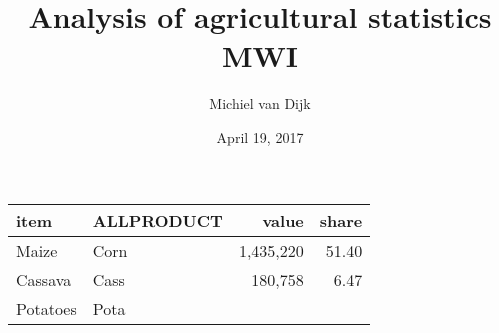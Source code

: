\documentclass[]{article}
\title{Analysis of agricultural statistics MWI}
\author{Michiel van Dijk}
\date{April 19, 2017}
\begin{document}
\maketitle

\begin{longtable}[]{@{}llrr@{}}
\toprule
\begin{minipage}[b]{0.36\columnwidth}\raggedright\strut
item\strut
\end{minipage} & \begin{minipage}[b]{0.16\columnwidth}\raggedright\strut
ALLPRODUCT\strut
\end{minipage} & \begin{minipage}[b]{0.12\columnwidth}\raggedleft\strut
value\strut
\end{minipage} & \begin{minipage}[b]{0.09\columnwidth}\raggedleft\strut
share\strut
\end{minipage}\tabularnewline
\midrule
\endhead
\begin{minipage}[t]{0.36\columnwidth}\raggedright\strut
Maize\strut
\end{minipage} & \begin{minipage}[t]{0.16\columnwidth}\raggedright\strut
Corn\strut
\end{minipage} & \begin{minipage}[t]{0.12\columnwidth}\raggedleft\strut
1,435,220\strut
\end{minipage} & \begin{minipage}[t]{0.09\columnwidth}\raggedleft\strut
51.40\strut
\end{minipage}\tabularnewline
\begin{minipage}[t]{0.36\columnwidth}\raggedright\strut
Cassava\strut
\end{minipage} & \begin{minipage}[t]{0.16\columnwidth}\raggedright\strut
Cass\strut
\end{minipage} & \begin{minipage}[t]{0.12\columnwidth}\raggedleft\strut
180,758\strut
\end{minipage} & \begin{minipage}[t]{0.09\columnwidth}\raggedleft\strut
6.47\strut
\end{minipage}\tabularnewline
\begin{minipage}[t]{0.36\columnwidth}\raggedright\strut
Potatoes\strut
\end{minipage} & \begin{minipage}[t]{0.16\columnwidth}\raggedright\strut
Pota\strut

\end{minipage}
\end{longtable}
\end{document}

